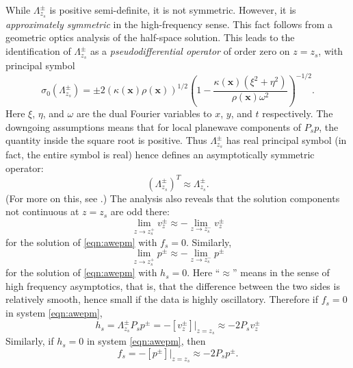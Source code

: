 \documentclass[georeport,12pt]{geophysics}
\newcommand{\bx}{\mathbf{x}}
\begin{document}
While $\Lambda^{\pm}_{z_s}$ is positive semi-definite, it is not
symmetric. However, it is {\em approximately symmetric} in the
high-frequency sense. This fact follows from a
geometric optics analysis of the half-space solution. This leads to
the identification of $\Lambda^{\pm}_{z_s}$ as a {\em
  pseudodifferential operator} of order zero on $z=z_s$, with principal symbol
\begin{equation}
  \label{eqn:lamsym}
  \sigma_0(\Lambda^{\pm}_{z_s}) = \pm 2(\kappa(\bx)
  \rho(\bx))^{1/2}\left(1-\frac{\kappa(\bx)(\xi^2+\eta^2)}{\rho(\bx)\omega^2}\right)^{-1/2}.
\end{equation}
Here $\xi$, $\eta$, and $\omega$ are the dual Fourier variables to
$x$, $y$, and $t$ respectively. The downgoing assumptions means that
for local planewave components of $P_sp$, the quantity inside the
square root is positive. Thus $\Lambda^{\pm}_{z_s}$ has real principal
symbol (in fact, the entire symbol is real) hence defines an
asymptotically symmetric operator:
\begin{equation}
  \label{eqn:lamappsim}
  (\Lambda^{\pm}_{z_s})^T \approx \Lambda^{\pm}_{z_s}.
\end{equation}
(For more on this, see \cite{StefUhl:05}.)
The analysis also reveals that the solution components not continuous
at $z=z_s$ are odd there:
\begin{equation}
  \label{eqn:odd1}
  \lim_{z\rightarrow z_s^+} v^{\pm}_{z} \approx - \lim_{z\rightarrow z_s^-}
  v^{\pm}_{z}
\end{equation}
for the solution of \ref{eqn:awepm} with $f_s=0$.
Similarly, 
\begin{equation}
  \label{eqn:odd2}
  \lim_{z\rightarrow z_s^+} p^{\pm}\approx - \lim_{z\rightarrow z_s^-}
  p^{\pm}
\end{equation}
for the solution of \ref{eqn:awepm} with $h_s=0$. Here ``$\approx$''
means in the sense of high frequency asymptotics, that is, that the
difference between the two sides is relatively smooth, hence small if
the data is highly oscillatory. Therefore if $f_s=0$ in system \ref{eqn:awepm},
\begin{equation}
  h_s = \Lambda^{\pm}_{z_s}P_sp^{\pm} = -[v^{\pm}_{z}]|_{z=z_s} \approx -2
  P_sv^{\pm}_{z}
  \label{eqn:tracejump10}
\end{equation}
Similarly, if $h_s=0$ in system \ref{eqn:awepm}, then
\begin{equation}
  \label{eqn:tracejump20}
  f_s = -[p^{\pm}]|_{z=z_s} \approx -2 P_s p^{\pm}.
\end{equation}
\end{document}
